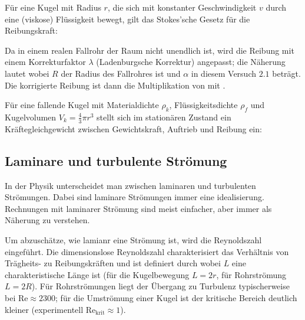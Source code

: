 Für eine Kugel mit Radius \(r\), die sich mit konstanter Geschwindigkeit \(v\) durch eine (viskose) Flüssigkeit bewegt, gilt das Stokes'sche Gesetz für die Reibungskraft:


Da in einem realen Fallrohr der Raum nicht unendlich ist, wird die Reibung mit einem Korrekturfaktor \(\lambda\) (Ladenburgsche Korrektur) angepasst; die Näherung lautet
wobei \(R\) der Radius des Fallrohres ist und \(\alpha\) in diesem Versuch \(2.1\) beträgt. Die korrigierte Reibung ist dann die Multiplikation von  mit .


Für eine fallende Kugel mit Materialdichte \(\rho_k\), Flüssigkeitsdichte \(\rho_f\) und Kugelvolumen \(V_k=\tfrac{4}{3}\pi r^3\) stellt sich im stationären Zustand ein Kräftegleichgewicht zwischen Gewichtskraft, Auftrieb und Reibung ein:

\subsection{Laminare und turbulente Strömung}

In der Physik unterscheidet man zwischen laminaren und turbulenten Strömungen. Dabei sind laminare Strömungen immer eine idealisierung. Rechnungen mit laminarer Strömung sind meist einfacher, aber immer als Näherung zu verstehen.




Um abzuschätze, wie lamianr eine Strömung ist, wird die Reynoldszahl eingeführt. Die dimensionslose Reynoldszahl charakterisiert das Verhältnis von Trägheits- zu Reibungskräften und ist definiert durch
wobei \(L\) eine charakteristische Länge ist (für die Kugelbewegung \(L=2r\), für Rohrströmung \(L=2R\)). Für Rohrströmungen liegt der Übergang zu Turbulenz typischerweise bei \(\mathrm{Re}\approx 2300\); für die Umströmung einer Kugel ist der kritische Bereich deutlich kleiner (experimentell \(\mathrm{Re}_{\mathrm{krit}}\approx 1\)).

